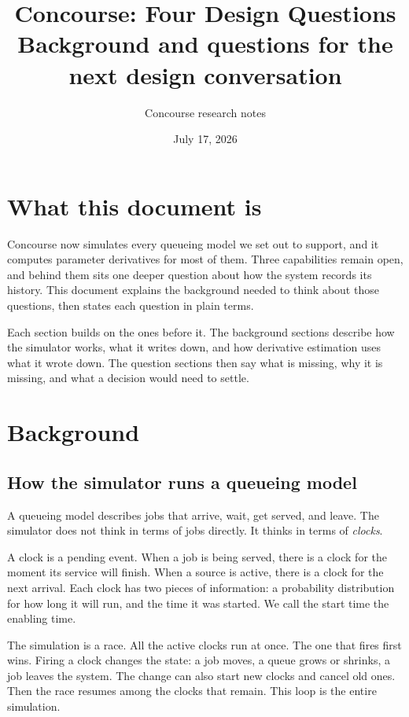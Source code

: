 \documentclass[11pt]{article}
\title{Concourse: Four Design Questions\\
\large Background and questions for the next design conversation}
\author{Concourse research notes}
\date{July 17, 2026}
\begin{document}
\maketitle
\tableofcontents

\section{What this document is}

Concourse now simulates every queueing model we set out to support, and it
computes parameter derivatives for most of them. Three capabilities remain
open, and behind them sits one deeper question about how the system records
its history. This document explains the background needed to think about
those questions, then states each question in plain terms.

Each section builds on the ones before it. The background sections describe
how the simulator works, what it writes down, and how derivative estimation
uses what it wrote down. The question sections then say what is missing,
why it is missing, and what a decision would need to settle.

\section{Background}

\subsection{How the simulator runs a queueing model}

A queueing model describes jobs that arrive, wait, get served, and leave.
The simulator does not think in terms of jobs directly. It thinks in terms
of \emph{clocks}.

A clock is a pending event. When a job is being served, there is a clock
for the moment its service will finish. When a source is active, there is a
clock for the next arrival. Each clock has two pieces of information: a
probability distribution for how long it will run, and the time it was
started. We call the start time the enabling time.

The simulation is a race. All the active clocks run at once. The one that
fires first wins. Firing a clock changes the state: a job moves, a queue
grows or shrinks, a job leaves the system. The change can also start new
clocks and cancel old ones. Then the race resumes among the clocks that
remain. This loop is the entire simulation.
\end{document}
